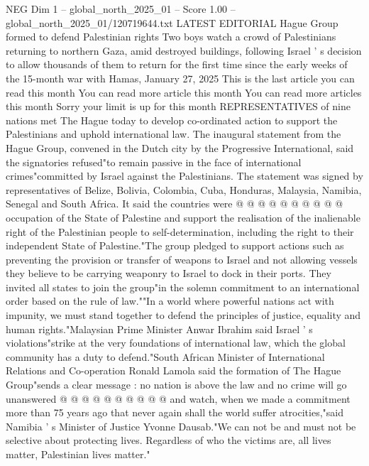 \begin{textsample}{NEG Dim 1 – global\_north\_2025\_01 – Score 1.00 – global\_north\_2025\_01/120719644.txt}  \label{ex:f1_neg_065}
LATEST EDITORIAL Hague Group formed to defend Palestinian rights Two boys watch a crowd of Palestinians returning to northern Gaza, amid destroyed buildings, following Israel ' s decision to allow thousands of them to return for the first time since the early weeks of the 15-month war with Hamas, January 27, 2025 This is the last article you can read this month You can read more article this month You can read more articles this month Sorry your limit is up for this month REPRESENTATIVES of nine nations met The Hague today to develop co-ordinated action to support the Palestinians and uphold international law.
The inaugural statement from the Hague Group, convened in the Dutch city by the Progressive International, said the signatories refused"to remain passive in the face of international crimes"committed by Israel against the Palestinians.
The statement was signed by representatives of Belize, Bolivia, Colombia, Cuba, Honduras, Malaysia, Namibia, Senegal and South Africa.
It said the countries were @ @ @ @ @ @ @ @ @ @ occupation of the State of Palestine and support the realisation of the inalienable right of the Palestinian people to self-determination, including the right to their independent State of Palestine."The group pledged to support actions such as preventing the provision or transfer of weapons to Israel and not allowing vessels they believe to be carrying weaponry to Israel to dock in their ports.
They invited all states to join the group"in the solemn commitment to an international order based on the rule of law.""In a world where powerful nations act with impunity, we must stand together to defend the principles of justice, equality and human rights."Malaysian Prime Minister Anwar Ibrahim said Israel ' s violations"strike at the very foundations of international law, which the global community has a duty to defend."South African Minister of International Relations and Co-operation Ronald Lamola said the formation of The Hague Group"sends a clear message : no nation is above the law and no crime will go unanswered @ @ @ @ @ @ @ @ @ @ and watch, when we made a commitment more than 75 years ago that never again shall the world suffer atrocities,"said Namibia ' s Minister of Justice Yvonne Dausab."We can not be and must not be selective about protecting lives.
Regardless of who the victims are, all lives matter, Palestinian lives matter."

\end{textsample}

